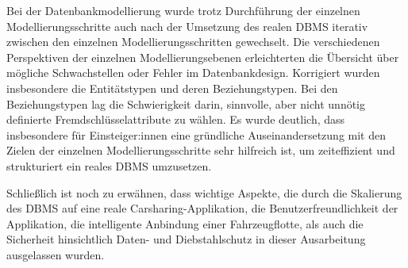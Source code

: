 Bei der Datenbankmodellierung wurde trotz Durchführung der einzelnen Modellierungsschritte auch nach der Umsetzung des realen DBMS iterativ zwischen den einzelnen Modellierungsschritten gewechselt. Die verschiedenen Perspektiven der einzelnen Modellierungsebenen erleichterten die Übersicht über mögliche Schwachstellen oder Fehler im Datenbankdesign. Korrigiert wurden insbesondere die Entitätstypen und deren Beziehungstypen. Bei den Beziehungstypen lag die Schwierigkeit darin, sinnvolle, aber nicht unnötig definierte Fremdschlüsselattribute zu wählen. Es wurde deutlich, dass insbesondere für Einsteiger:innen eine gründliche Auseinandersetzung mit den Zielen der einzelnen Modellierungsschritte sehr hilfreich ist, um zeiteffizient und strukturiert ein reales DBMS umzusetzen. 

Schließlich ist noch zu erwähnen, dass wichtige Aspekte, die durch die Skalierung des DBMS auf eine reale Carsharing-Applikation, die Benutzerfreundlichkeit der Applikation, die intelligente Anbindung einer Fahrzeugflotte, als auch die Sicherheit hinsichtlich Daten- und Diebstahlschutz in dieser Ausarbeitung ausgelassen wurden.